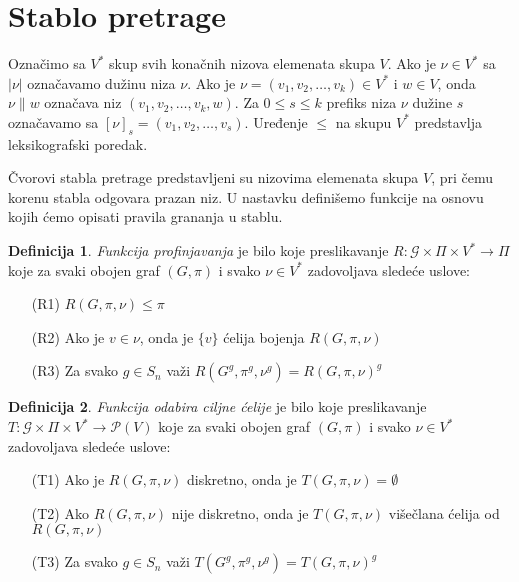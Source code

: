 \documentclass[12pt,oneside]{memoir}
\theoremstyle{definition}
\newtheorem*{definition}{Definicija}
\begin{document}
 \section{Stablo pretrage}

  Označimo sa $V^*$ skup svih konačnih nizova elemenata skupa $V$. Ako je $\nu
  \in V^*$ sa $|\nu|$ označavamo dužinu niza $\nu$. Ako je $\nu = (v_1, v_2,
  \dots, v_k) \in V^*$ i $w \in V$, onda $\nu \| w$ označava niz $(v_1, v_2,
  \dots, v_k, w)$. Za $0 \leq s \leq k$ prefiks niza $\nu$ dužine $s$ označavamo
  sa $[\nu]_s = (v_1, v_2, \dots, v_s)$. Uređenje $\leq$ na skupu $V^*$
  predstavlja leksikografski poredak.

  Čvorovi stabla pretrage  predstavljeni su nizovima elemenata skupa $V$, pri
  čemu korenu stabla odgovara prazan niz. U nastavku definišemo funkcije na
  osnovu kojih ćemo opisati pravila grananja u stablu.

  \begin{definition}
   \emph{Funkcija profinjavanja} je bilo koje preslikavanje $R : \mathcal{G}
	  \times \Pi \times V^* \to \Pi$ koje za svaki obojen graf $(G, \pi)$ i
	  svako $\nu \in V^*$ zadovoljava sledeće uslove:
  
   \begin{itemize}
       \item[(R1)] $R(G, \pi, \nu) \leq \pi$
       \item[(R2)] Ako je $v \in \nu$, onda je $\{v\}$ ćelija bojenja $R(G,
     	  \pi, \nu)$
       \item[(R3)] Za svako $g \in S_n$ važi $R(G^g, \pi^g, \nu^g) = R(G,
     	 \pi, \nu)^g$
   \end{itemize}
  \end{definition}

  \begin{definition}
   \emph{Funkcija odabira ciljne ćelije} je bilo koje preslikavanje $T :
	  \mathcal{G} \times \Pi \times V^* \to \mathcal{P}(V)$ koje za svaki
	  obojen graf $(G, \pi)$ i svako $\nu \in V^*$ zadovoljava sledeće
	  uslove:
  
   \begin{itemize}
       \item[(T1)] Ako je $R(G, \pi, \nu)$ diskretno, onda je $T(G, \pi, \nu) =
     	  \emptyset$
       \item[(T2)] Ako $R(G, \pi, \nu)$ nije diskretno, onda je $T(G, \pi, \nu)$
     	  višečlana ćelija od $R(G, \pi, \nu)$
       \item[(T3)] Za svako $g \in S_n$ važi $T(G^g, \pi^g, \nu^g) = T(G, \pi,
     	 \nu)^g$
   \end{itemize}
  \end{definition}
\end{document}
